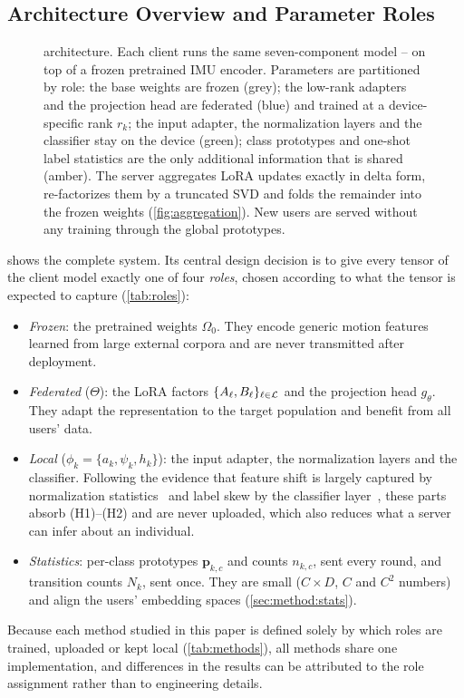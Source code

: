 \subsection{Architecture Overview and Parameter Roles}\label{sec:method:arch}

\begin{figure}[!t]
  \centering
  \resizebox{\textwidth}{!}{}
  \caption{\method{} architecture. Each client runs the same seven-component model
  -- on top of a frozen pretrained IMU encoder. Parameters are partitioned by
  role: the base weights are frozen (grey); the low-rank adapters and the projection head are
  federated (blue) and trained at a device-specific rank $r_k$; the input adapter, the
  normalization layers and the classifier stay on the device (green); class prototypes and
  one-shot label statistics are the only additional information that is shared (amber). The
  server aggregates LoRA updates exactly in delta form, re-factorizes them by a truncated SVD
  and folds the remainder into the frozen weights (\cref{fig:aggregation}). New users are served
  without any training through the global prototypes.}
  \label{fig:architecture}
\end{figure}

 shows the complete system. Its central design decision is to give every
tensor of the client model exactly one of four \emph{roles}, chosen according to what the
tensor is expected to capture (\cref{tab:roles}):
\begin{itemize}
  \item \emph{Frozen}: the pretrained weights $\Omega_0$. They encode generic motion features
        learned from large external corpora and are never transmitted after deployment.
  \item \emph{Federated} ($\Theta$): the LoRA factors $\{A_\ell,B_\ell\}_{\ell\in\mathcal{L}}$ and the
        projection head $g_\theta$. They adapt the representation to the target population and
        benefit from all users' data.
  \item \emph{Local} ($\phi_k=\{a_k,\psi_k,h_k\}$): the input adapter, the normalization layers and
        the classifier. Following the evidence that feature shift is largely captured by
        normalization statistics~\cite{li2021fedbn} and label skew by the classifier
        layer~\cite{collins2021fedrep,arivazhagan2019fedper}, these parts absorb (H1)--(H2) and are
        never uploaded, which also reduces what a server can infer about an individual.
  \item \emph{Statistics}: per-class prototypes $\mathbf{p}_{k,c}$ and counts $n_{k,c}$, sent every
        round, and transition counts $N_k$, sent once. They are small ($C\times D$, $C$ and
        $C^2$ numbers) and align the users' embedding spaces (\cref{sec:method:stats}).
\end{itemize}
Because each method studied in this paper is defined solely by which roles are trained, uploaded
or kept local (\cref{tab:methods}), all methods share one implementation, and differences in the
results can be attributed to the role assignment rather than to engineering details.

